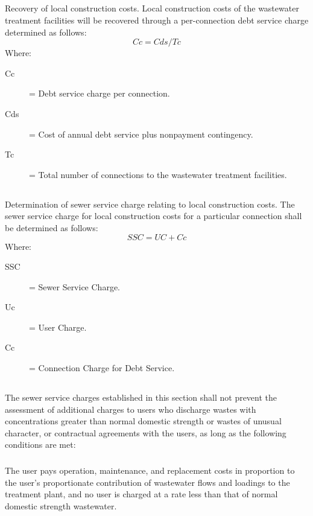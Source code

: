\documentclass[code.tex]{subfiles}
\begin{document}
\subsection{}
Recovery of local construction costs.  Local construction costs of the wastewater treatment facilities will be recovered through a per-connection debt service charge determined as follows:
\begin{equation*}
Cc = Cds/Tc
\end{equation*}
Where:
\begin{description}
\item[Cc] = Debt service charge per connection.
\item[Cds] = Cost of annual debt service plus nonpayment contingency.
\item[Tc] = Total number of connections to the wastewater treatment facilities.
\end{description}
\subsection{}
Determination of sewer service charge relating to local construction costs.  The sewer service charge for local construction costs for a particular connection shall be determined as follows:
\begin{equation*}
SSC = UC + Cc
\end{equation*}
Where:
\begin{description}
\item[SSC] = Sewer Service Charge.
\item[Uc] = User Charge.
\item[Cc] = Connection Charge for Debt Service.
\end{description}
\subsection{}
The sewer service charges established in this section shall not prevent the assessment of additional charges to users who discharge wastes with concentrations greater than normal domestic strength or wastes of unusual character, or contractual agreements with the users, as long as the following conditions are met:
\subsubsection{}
The user pays operation, maintenance, and replacement costs in proportion to the user’s proportionate contribution of wastewater flows and loadings to the treatment plant, and no user is charged at a rate less than that of normal domestic strength wastewater.
\end{document}
